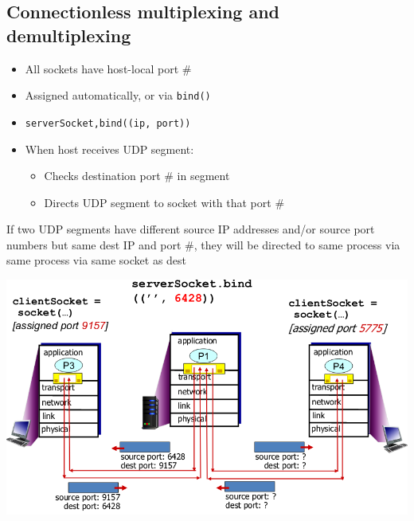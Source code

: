 \documentclass{article}[18pt]
\begin{document}
\subsection{Connectionless multiplexing and demultiplexing}
\begin{itemize}
	\item All sockets have host-local port \#
	\item Assigned automatically, or via \texttt{bind()}
	\item \texttt{serverSocket,bind((ip, port))}
	\item When host receives UDP segment:
	\begin{itemize}
		\item Checks destination port \# in segment
		\item Directs UDP segment to socket with that port \#
	\end{itemize}
\end{itemize}
If two UDP segments have different source IP addresses and/or source port numbers but same dest IP and port \#, they will be directed to same process via same process via same socket as dest
\begin{center}
	\includegraphics[scale=0.7]{demultiplexing}
\end{center}
\end{document}
